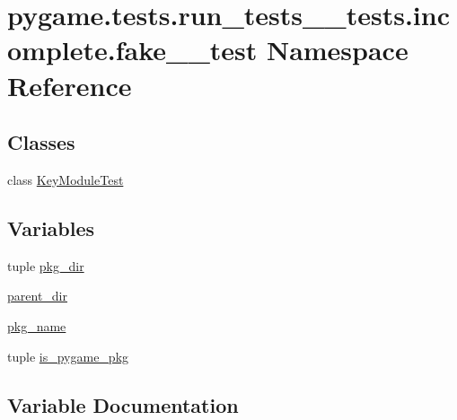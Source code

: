 \hypertarget{namespacepygame_1_1tests_1_1run__tests____tests_1_1incomplete_1_1fake__2__test}{}\section{pygame.\+tests.\+run\+\_\+tests\+\_\+\+\_\+tests.\+incomplete.\+fake\+\_\+\_\+test Namespace Reference}
\label{namespacepygame_1_1tests_1_1run__tests____tests_1_1incomplete_1_1fake__2__test}
\subsection*{Classes}
\begin{DoxyCompactItemize}
\item 
class \hyperlink{classpygame_1_1tests_1_1run__tests____tests_1_1incomplete_1_1fake__2__test_1_1_key_module_test}{Key\+Module\+Test}
\end{DoxyCompactItemize}
\subsection*{Variables}
\begin{DoxyCompactItemize}
\item 
tuple \hyperlink{namespacepygame_1_1tests_1_1run__tests____tests_1_1incomplete_1_1fake__2__test_aedc9378fa57b48b9ba8b9655fb5119c2}{pkg\+\_\+dir}
\item 
\hyperlink{namespacepygame_1_1tests_1_1run__tests____tests_1_1incomplete_1_1fake__2__test_af1a43db2cb69f8880dbd7210a0d86d82}{parent\+\_\+dir}
\item 
\hyperlink{namespacepygame_1_1tests_1_1run__tests____tests_1_1incomplete_1_1fake__2__test_a39c91616725f3e659a27a47a41553856}{pkg\+\_\+name}
\item 
tuple \hyperlink{namespacepygame_1_1tests_1_1run__tests____tests_1_1incomplete_1_1fake__2__test_adf9949f073676cf3feca4e74598b24de}{is\+\_\+pygame\+\_\+pkg}
\end{DoxyCompactItemize}


\subsection{Variable Documentation}
\mbox{\label{namespacepygame_1_1tests_1_1run__tests____tests_1_1incomplete_1_1fake__2__test_adf9949f073676cf3feca4e74598b24de}} 
